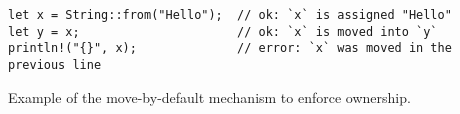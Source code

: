 \begin{listing}
    \begin{verbatim}
let x = String::from("Hello");  // ok: `x` is assigned "Hello"
let y = x;                      // ok: `x` is moved into `y`
println!("{}", x);              // error: `x` was moved in the previous line
    \end{verbatim}
    \caption{Example of the move-by-default mechanism to enforce ownership.}
    \label{lst:rust-move}
\end{listing}